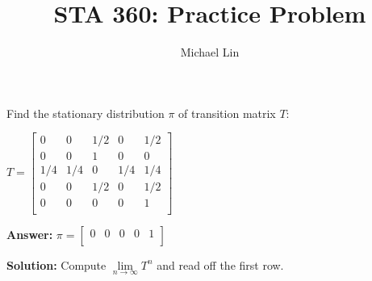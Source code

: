 \documentclass{article}
\title{STA 360: Practice Problem}
\author{Michael Lin}
\begin{document}
\maketitle

Find the stationary distribution $\pi$ of transition matrix $T$:
\begin{center}
$T = 
\begin{bmatrix}
0 & 0 & 1/2 & 0 & 1/2 \\
0 & 0 & 1 & 0 & 0 \\
1/4 & 1/4 & 0 & 1/4 & 1/4 \\
0 & 0 & 1/2 & 0 & 1/2 \\
0 & 0 & 0 & 0 & 1 \\
\end{bmatrix}
$
\end{center}

\textbf{Answer:} $\pi=
\begin{bmatrix}
0 & 0 & 0 & 0 & 1 \\
\end{bmatrix}
$

\textbf{Solution:} Compute $\lim\limits_{n\to \infty} T^n$ and read off the first row.
\end{document}
